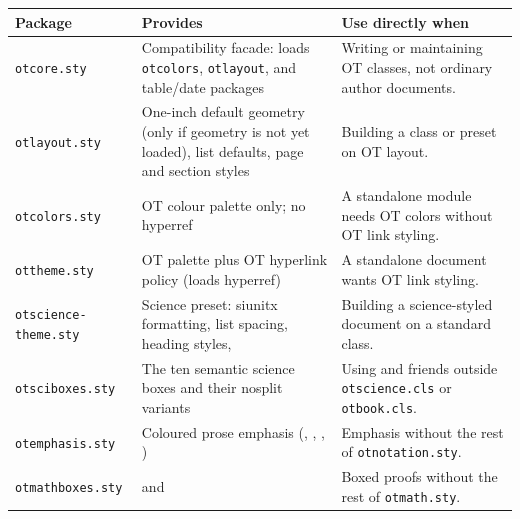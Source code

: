 \documentclass[10pt,a4paper]{article}
\newcommand{\code}[1]{\texttt{\small\detokenize{#1}}}
\newcommand{\pkg}[1]{\texttt{#1}}
\begin{document}
\begin{longtable}{p{}p{}p{}}
  \toprule
  Package                 & Provides                                                                                 & Use directly when                                                                                                \\
  \midrule
  \pkg{otcore.sty}        & Compatibility facade: loads \pkg{otcolors}, \pkg{otlayout}, and table/date packages     & Writing or maintaining OT classes, not ordinary author documents.                                                \\
  \pkg{otlayout.sty}      & One-inch default geometry (only if geometry is not yet loaded), list defaults, page and section styles & Building a class or preset on OT layout.                                                                         \\
  \pkg{otcolors.sty}      & OT colour palette only; no hyperref                                                      & A standalone module needs OT colors without OT link styling.                                                     \\
  \pkg{ottheme.sty}       & OT palette plus OT hyperlink policy (loads hyperref)                                     & A standalone document wants OT link styling.                                                                     \\
  \pkg{otscience-theme.sty} & Science preset: siunitx formatting, list spacing, heading styles, \code{\otsciencepagestyle} & Building a science-styled document on a standard class.                                                          \\
  \pkg{otsciboxes.sty}    & The ten semantic science boxes and their nosplit variants                                & Using \code{definitionbox} and friends outside \pkg{otscience.cls} or \pkg{otbook.cls}.                        \\
  \pkg{otemphasis.sty}    & Coloured prose emphasis (\code{\otimportant}, \code{\otkeyterm}, \code{\otconcept}, \code{\otresult}) & Emphasis without the rest of \pkg{otnotation.sty}.                                                              \\
  \pkg{otmathboxes.sty}   & \code{proofbox} and \code{identitybox}                                                     & Boxed proofs without the rest of \pkg{otmath.sty}.                                                              \\

\end{longtable}
\end{document}
